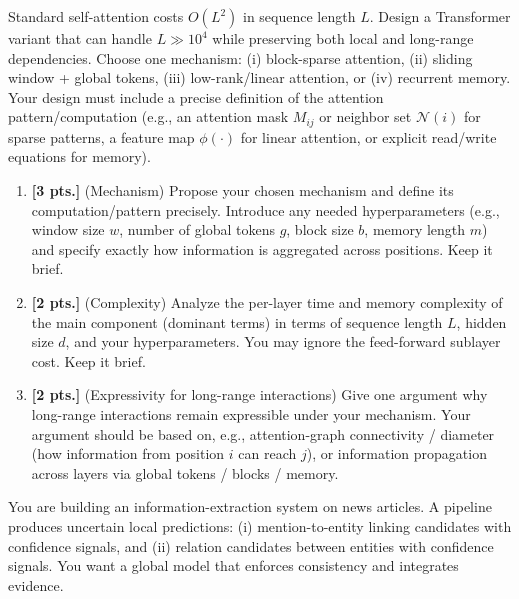 \documentclass[11pt,a4paper]{article}
\newcommand{\examstatement}[1]{%
  \par\addvspace{0.85em}%
  \noindent{\bfseries #1}\par\nobreak\addvspace{0.28em}%
}
\begin{document}
\examstatement{Problem 3. [7 pts.]}
Standard self-attention costs $O(L^{2})$ in sequence length $L$. Design a Transformer variant that can handle $L \gg 10^{4}$ while preserving both local and long-range dependencies. Choose one mechanism: (i) block-sparse attention, (ii) sliding window + global tokens, (iii) low-rank/linear attention, or (iv) recurrent memory. Your design must include a precise definition of the attention pattern/computation (e.g., an attention mask $M_{ij}$ or neighbor set $\mathcal{N}(i)$ for sparse patterns, a feature map $\phi(\cdot)$ for linear attention, or explicit read/write equations for memory).
\begin{enumerate}[label=(\alph*)]
    \item \textbf{[3 pts.]} (Mechanism) Propose your chosen mechanism and define its computation/pattern precisely. Introduce any needed hyperparameters (e.g., window size $w$, number of global tokens $g$, block size $b$, memory length $m$) and specify exactly how information is aggregated across positions. Keep it brief.
    \item \textbf{[2 pts.]} (Complexity) Analyze the per-layer time and memory complexity of the main component (dominant terms) in terms of sequence length $L$, hidden size $d$, and your hyperparameters. You may ignore the feed-forward sublayer cost. Keep it brief.
    \item \textbf{[2 pts.]} (Expressivity for long-range interactions) Give one argument why long-range interactions remain expressible under your mechanism. Your argument should be based on, e.g., attention-graph connectivity / diameter (how information from position $i$ can reach $j$), or information propagation across layers via global tokens / blocks / memory.
\end{enumerate}

\examstatement{Problem 4. [7 pts.]}
You are building an information-extraction system on news articles. A pipeline produces uncertain local predictions: (i) mention-to-entity linking candidates with confidence signals, and (ii) relation candidates between entities with confidence signals. You want a global model that enforces consistency and integrates evidence.
\end{document}
